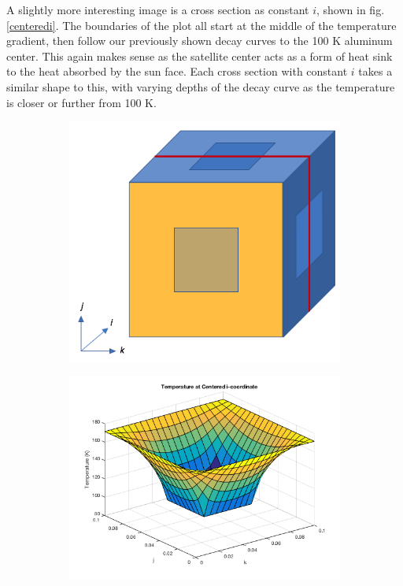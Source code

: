 \documentclass[12pt]{article}
\begin{document}
A slightly more interesting image is a cross section as constant $i$, shown in fig. \ref{centeredi}.  The boundaries of the plot all start at the middle of the temperature gradient, then follow our previously shown decay curves to the 100 K aluminum center.  This again makes sense as the satellite center acts as a form of heat sink to the heat absorbed by the sun face.  Each cross section with constant $i$ takes a similar shape to this, with varying depths of the decay curve as the temperature is closer or further from 100 K.

\begin{figure}[h!]
\begin{center}
\begin{subfigure}{0.3\textwidth}
\includegraphics[width=\linewidth]{../pics/centeredipic.png}
\caption{\label{centeredipic}}
\end{subfigure}
\begin{subfigure}{0.6\textwidth}
\includegraphics[width=\linewidth]{../pics/centeredi.png}

\end{subfigure}
\end{center}
\end{figure}
\end{document}
